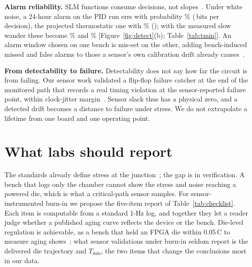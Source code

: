 \documentclass[10pt,twocolumn]{article}
\newcommand{\Tmin}{T_{\min}}
\newcommand{\degC}{\,\textdegree C}
\begin{document}
\textbf{Alarm reliability.} SLM functions consume decisions, not slopes~\cite{kashyap}. Under white noise, a 24-hour alarm on the PID run errs with probability \vPerrPidBound\% (\vCpidBound\,bits per decision), the projected thermostatic one with \vPerrBbBound\% (\vCbbBound); with the measured slow wander these become \vPerrPidLrv\% and \vPerrBbLrv\% [Figure~\ref{fig:detect}(b); Table~\ref{tab:tmin}]. An alarm window chosen on one bench is mis-set on the other, adding bench-induced missed and false alarms to those a sensor's own calibration drift already causes~\cite{anik}.

\textbf{From detectability to failure.} Detectability does not say how far the circuit is from failing. Our sensor work validated a flip-flop failure catcher at the end of the monitored path that records a real timing violation at the sensor-reported failure point, within clock-jitter margin~\cite{sbcci25}. Sensor slack thus has a physical zero, and a detected drift becomes a distance to failure under stress. We do not extrapolate a lifetime from one board and one operating point.

\section{What labs should report}

The standards already define stress at the junction~\cite{jedec}; the gap is in verification. A bench that logs only the chamber cannot show the stress and noise reaching a powered die, which is what a critical-path sensor samples. For sensor-instrumented burn-in we propose the five-item report of Table~\ref{tab:checklist}. Each item is computable from a standard 1-Hz log, and together they let a reader judge whether a published aging curve reflects the device or the bench. Die-level regulation is achievable, as a bench that held an FPGA die within 0.05\degC{} to measure aging shows~\cite{sobas}; what sensor validations under burn-in seldom report is the delivered die trajectory and $\Tmin$, the two items that change the conclusions most in our data.
\end{document}
